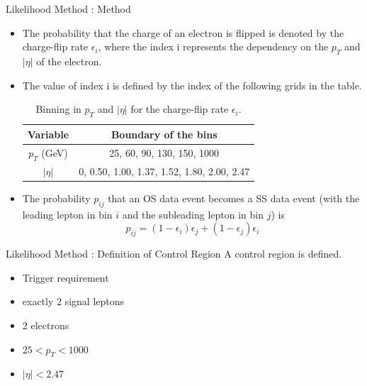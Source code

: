 \documentclass[mathserif,serif]{beamer}
\begin{document}
\begin{frame}{Likelihood Method : Method}
\begin{itemize}
\item The probability that the charge of an electron is flipped is denoted by the charge-flip rate $\epsilon_i$, where the index i represents the dependency on the $p_T$ and $|\eta|$ of the electron.
\item The value of index i is defined by the index of the following grids in the table.

\begin{table}[htbp]
\centering
\begin{tabular}{|c|c|}
\hline
Variable & Boundary of the bins \\
\hline
$p_T$ (GeV) &  25, 60, 90, 130, 150, 1000 \\
\hline
$|\eta|$ & 0, 0.50, 1.00, 1.37, 1.52, 1.80, 2.00, 2.47 \\
\hline
\end{tabular}
\caption{Binning in $p_T$ and $|\eta|$ for the charge-flip rate $\epsilon_i$.}
\end{table}

\item The probability $p_{ij}$ that an OS data event becomes a SS data event (with the leading lepton in bin $i$ and the subleading lepton in bin $j$) is
\begin{equation*}
p_{ij} = (1 - \epsilon_i)\epsilon_j + (1 - \epsilon_j)\epsilon_i
\end{equation*}
\end{itemize}

\end{frame}

\begin{frame}{Likelihood Method : Definition of Control Region}
A control region is defined.
\begin{itemize}
\item Trigger requirement
\item exactly 2 signal leptons
\item 2 electrons
\item $25 <p_T < 1000$
\item $|\eta| < 2.47$
\end{itemize}
\end{frame}
\end{document}
